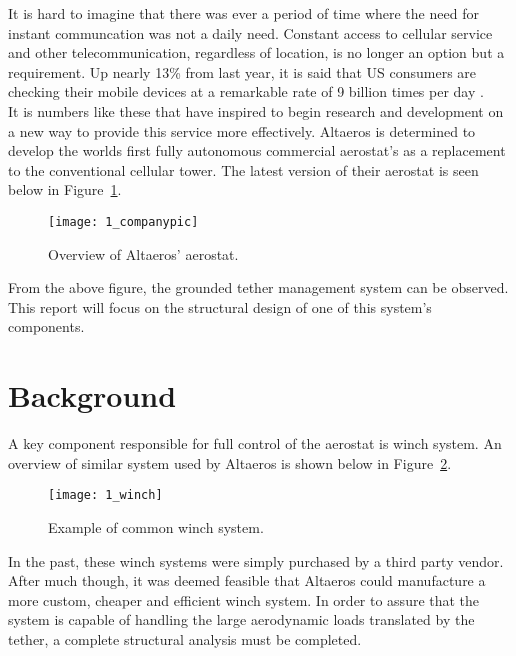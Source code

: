 \label{chapt:intro}

It is hard to imagine that there was ever a period of time where the need for instant communcation was not a daily need. Constant access to cellular service and other telecommunication, regardless of location, is no longer an option but a requirement. Up nearly 13\% from last year, it is said that US consumers are checking their mobile devices at a remarkable rate of 9 billion times per day \cite{deloittestat}.\\

It is numbers like these that have inspired \Company to begin research and development on a new way to provide this service more effectively. Altaeros is determined to develop the worlds first fully autonomous commercial aerostat's as a replacement to the conventional cellular tower. The latest version of their aerostat is seen below in Figure~\ref{fig:1_companypic}.

\begin{figure}[H]
	\centering
	\texttt{[image: 1\_companypic]}
	\caption[Overview of Altaeros' aerostat.]{Overview of Altaeros' aerostat.\protect\cite{companypicweb}}
	\label{fig:1_companypic}
\end{figure}

From the above figure, the grounded tether management system can be observed. This report will focus on the structural design of one of this system's components.

\section{Background} 

A key component responsible for full control of the aerostat is winch system. An overview of similar system used by Altaeros is shown below in Figure~\ref{fig:1_winch}.
\begin{figure}[H]
	\centering
	\texttt{[image: 1\_winch]}
	\caption[Example of common winch system.]{Example of common winch system.\protect\cite{winchpic}}
	\label{fig:1_winch}
\end{figure}

In the past, these winch systems were simply purchased by a third party vendor. After much though, it was deemed feasible that Altaeros could manufacture a more custom, cheaper and efficient winch system. In order to assure that the system is capable of handling the large aerodynamic loads translated by the tether, a complete structural analysis must be completed.

